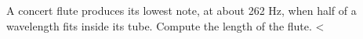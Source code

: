 A concert flute produces its
lowest note, at about 262 Hz, when half of a wavelength fits
inside its tube.  Compute the length of the flute.
<%
